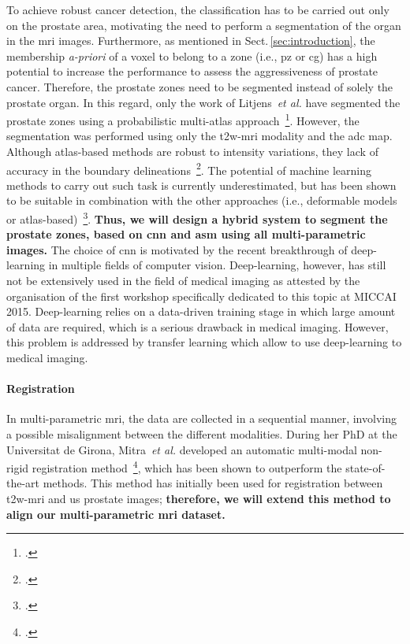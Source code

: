 To achieve robust cancer detection, the classification has to be carried out only on the prostate area, motivating the need to perform a segmentation of the organ in the \ac{mri} images.
Furthermore, as mentioned in Sect.\,\ref{sec:introduction}, the membership \emph{a-priori} of a voxel to belong to a zone (i.e., \ac{pz} or \ac{cg}) has a high potential to increase the performance to assess the aggressiveness of prostate cancer.
Therefore, the prostate zones need to be segmented instead of solely the prostate organ.
In this regard, only the work of Litjens~\emph{et al.} have segmented the prostate zones using a probabilistic multi-atlas approach~\footcite{Litjens2014a}.
However, the segmentation was performed using only the \ac{t2w}-\ac{mri} modality and the \ac{adc} map.
Although atlas-based methods are robust to intensity variations, they lack of accuracy in the boundary delineations~\footcite{Ghose2012}.
The potential of machine learning methods to carry out such task is currently underestimated, but has been shown to be suitable in combination with the other approaches (i.e., deformable models or atlas-based)~\footcite{ghose2012graph}.
\textbf{Thus, we will design a hybrid system to segment the prostate zones, based on \ac{cnn} and \ac{asm} using all multi-parametric images.}
The choice of \ac{cnn} is motivated by the recent breakthrough of deep-learning in multiple fields of computer vision.
Deep-learning, however, has still not be extensively used in the field of medical imaging as attested by the organisation of the first workshop specifically dedicated to this topic at MICCAI 2015. 
Deep-learning relies on a data-driven training stage in which large amount of data are required, which is a serious drawback in medical imaging.
However, this problem is addressed by transfer learning which allow to use deep-learning to medical imaging.

\paragraph{Registration}

In multi-parametric \ac{mri}, the data are collected in a sequential manner, involving a possible misalignment between the different modalities.
During her PhD at the Universitat de Girona, Mitra~\emph{et al.} developed an automatic multi-modal non-rigid registration method~\footcite{Mitra2012a}, which has been shown to outperform the state-of-the-art methods.
This method has initially been used for registration between \ac{t2w}-\ac{mri} and \ac{us} prostate images; \textbf{therefore, we will extend this method to align our multi-parametric \ac{mri} dataset.}

